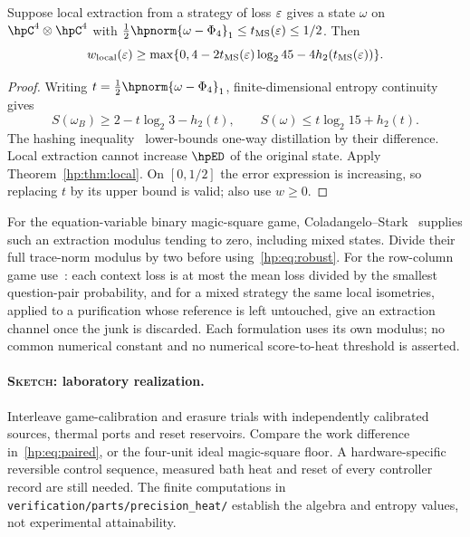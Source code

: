 \begin{proposition}\label{hp:prop:robust}
Suppose local extraction from a strategy of loss $\varepsilon$ gives a state $\omega$ on $\hpC^4\otimes\hpC^4$ with $\frac12\hpnorm{\omega-\Phi_4}_1\le t_{\rm MS}(\eps)\le1/2$. Then
\begin{equation}
 w_{\rm local}(\varepsilon)\ge
 \max\{0,4-2t_{\rm MS}(\varepsilon)\log_2 45-4h_2(t_{\rm MS}(\varepsilon))\}.\label{hp:eq:robust}
\end{equation}
\end{proposition}
\begin{proof}
Writing $t=\frac12\hpnorm{\omega-\Phi_4}_1$, finite-dimensional entropy continuity gives
\[
 S(\omega_B)\ge2-t\log_2 3-h_2(t),\qquad
 S(\omega)\le t\log_2 15+h_2(t).
\]
The hashing inequality~\cite[Theorem 10]{HPdw} lower-bounds one-way distillation by their difference. Local extraction cannot increase $\hpED$ of the original state. Apply Theorem~\ref{hp:thm:local}. On $[0,1/2]$ the error expression is increasing, so replacing $t$ by its upper bound is valid; also use $w\ge0$.
\end{proof}

For the equation-variable binary magic-square game, Coladangelo--Stark~\cite[Definition 4.14 and Theorem 6.9, arXiv v2]{HPcs} supplies such an extraction modulus tending to zero, including mixed states. Divide their full trace-norm modulus by two before using~\eqref{hp:eq:robust}. For the row-column game use~\cite[Appendix C, Lemma C.1 and equations (C18)--(C35), arXiv v2]{HPwu}: each context loss is at most the mean loss divided by the smallest question-pair probability, and for a mixed strategy the same local isometries, applied to a purification whose reference is left untouched, give an extraction channel once the junk is discarded. Each formulation uses its own modulus; no common numerical constant and no numerical score-to-heat threshold is asserted.

\paragraph{\textnormal{\textsc{Sketch}}: laboratory realization.}
Interleave game-calibration and erasure trials with independently calibrated sources, thermal ports and reset reservoirs. Compare the work difference in~\eqref{hp:eq:paired}, or the four-unit ideal magic-square floor. A hardware-specific reversible control sequence, measured bath heat and reset of every controller record are still needed. The finite computations in \texttt{verification/parts/precision\_heat/} establish the algebra and entropy values, not experimental attainability.

